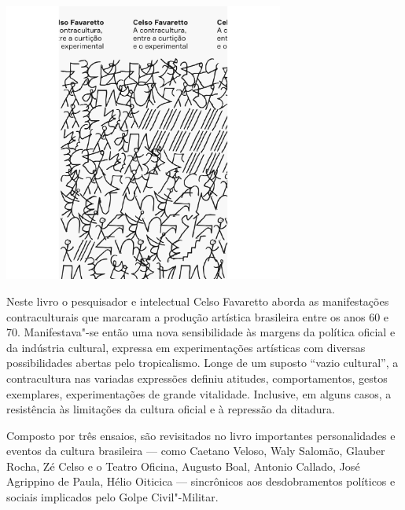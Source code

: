 \pagebreak


\begin{center}
\hspace*{-2.5cm}
\hspace*{2.5cm}\includegraphics[width=92mm]{./grid/favaretto.png}
\end{center}

\hspace*{-7cm}\hrulefill\hspace*{-7cm}

\medskip

\noindent{}Neste livro o pesquisador e intelectual Celso Favaretto aborda as manifestações contraculturais que marcaram a produção artística brasileira entre os anos 60 e 70. Manifestava"-se então uma nova sensibilidade às margens da política oficial e da indústria cultural, expressa em experimentações artísticas com diversas possibilidades abertas pelo tropicalismo. Longe de um suposto “vazio cultural”, a contracultura nas variadas expressões definiu atitudes, comportamentos, gestos exemplares, experimentações de grande vitalidade. Inclusive, em alguns casos, a resistência às limitações da cultura oficial e à repressão da ditadura.

Composto por três ensaios, são revisitados no livro importantes personalidades e eventos da cultura brasileira --- como Caetano Veloso, Waly Salomão, Glauber Rocha, Zé Celso e o Teatro Oficina, Augusto Boal, Antonio Callado, José Agrippino de Paula, Hélio Oiticica --- sincrônicos aos desdobramentos políticos e sociais implicados pelo Golpe Civil"-Militar.

\vfill

